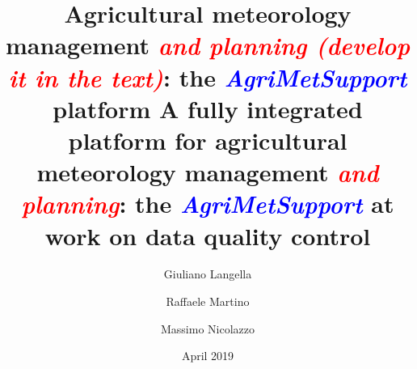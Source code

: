 \documentclass[authoryear,preprint,review,12pt]{elsarticle}
\newcommand{\note}[1]{\emph{\textcolor{red}{#1}}}
\newcommand{\update}[1]{\emph{\textcolor{blue}{#1}}}
\newcommand{\gci}{\update{AgriMetSupport}\xspace}
\begin{document}
\begin{frontmatter}



\title{Agricultural meteorology management \note{and planning (develop it in the text)}: the \gci platform }
\title{A fully integrated platform for agricultural meteorology management \note{and planning}: the \gci at work on data quality control }


\author[dia]{Giuliano Langella}
\address[dia]{Department of Agriculture, University of Naples Federico II, Via Università 100, 80055 Portici, NA, Italy}

\author[deeit]{Raffaele Martino}
\author[deeit]{Massimo Nicolazzo}
\address[deeit]{Department of Electrical Engineering and Information Technology, University of Naples Federico II, Via Claudio 21, 80125 Naples, NA, Italy}

\date{April 2019}

\begin{abstract}


\end{abstract}
\end{frontmatter}
\end{document}

